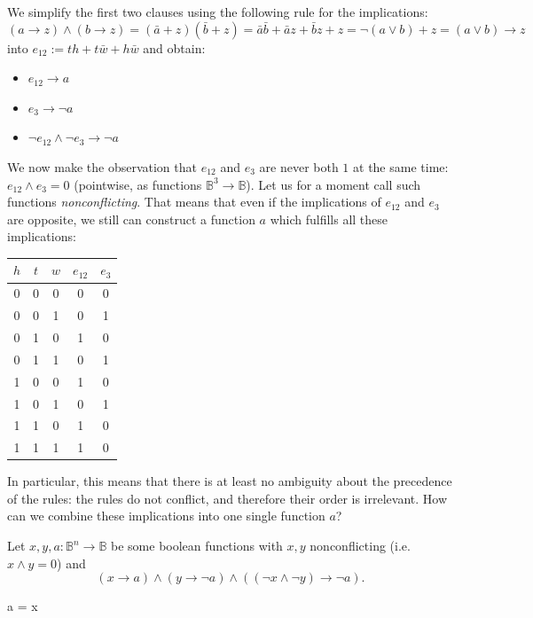 \documentclass[10pt,a4paper]{scrartcl}
\renewcommand{\implies}{\rightarrow}
\begin{document}
We simplify the first two clauses using the following rule for the implications:
\[
  (a \implies z)\wedge(b \implies z) = (\bar a + z)(\bar b + z) = 
  \bar a \bar b + \bar a z + \bar b z + z = 
  \neg (a \vee b) + z = (a \vee b) \implies z
\]
into $e_{12} := th + t\bar w + h \bar w$ and obtain:
\begin{itemize}
  \item $e_{12} \implies a$
  \item $e_3 \implies \neg a$
  \item $\neg e_{12} \wedge \neg e_3 \implies \neg a$
\end{itemize}
We now make the observation that $e_{12}$ and $e_3$ are never both $1$ at the same time: 
$e_{12} \wedge e_3 = 0$ (pointwise, as functions $\mathbb{B}^3 \to \mathbb{B}$).
Let us for a moment call such functions \emph{nonconflicting}.
That means that even if the implications of $e_{12}$ and $e_3$ are opposite, 
we still can construct a function $a$ which fulfills all these implications:

\vspace{0.5em}
\begin{tabular}{|ccc|c|c|}
\hline
$h$ & $t$ & $w$ & $e_{12}$ & $e_3$ \\
\hline
0 & 0 & 0 & 0 & 0 \\ 
0 & 0 & 1 & 0 & 1 \\ 
0 & 1 & 0 & 1 & 0 \\  
0 & 1 & 1 & 0 & 1 \\ 
1 & 0 & 0 & 1 & 0 \\ 
1 & 0 & 1 & 0 & 1 \\ 
1 & 1 & 0 & 1 & 0 \\ 
1 & 1 & 1 & 1 & 0 \\ 
\hline
\end{tabular}

In particular, this means that there is at least no ambiguity about the precedence
of the rules: the rules do not conflict, and therefore their order is irrelevant.
How can we combine these implications into one single function $a$?

Let $x,y,a: \mathbb{B}^n \to \mathbb{B}$ be some boolean functions with
$x,y$ nonconflicting (i.e. $x\wedge y = 0$) and 
\[
  (x \implies a) \wedge (y \implies \neg a) \wedge ((\neg x \wedge \neg y) \implies \neg a).
\]

 a = x
\end{document}
